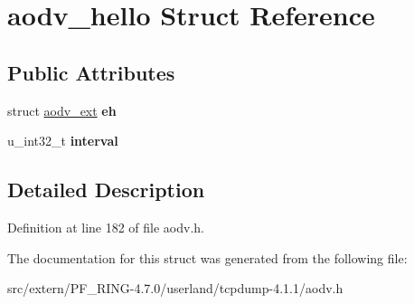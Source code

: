 \hypertarget{structaodv__hello}{
\section{aodv\_\-hello Struct Reference}
\label{structaodv__hello}
}
\subsection*{Public Attributes}
\begin{DoxyCompactItemize}
\item 
\hypertarget{structaodv__hello_a6d78b50a615c376a32d7a0448f4ae771}{
struct \hyperlink{structaodv__ext}{aodv\_\-ext} {\bfseries eh}}
\label{structaodv__hello_a6d78b50a615c376a32d7a0448f4ae771}

\item 
\hypertarget{structaodv__hello_af71ee633f6ef731ca906a4aeaeec6c6c}{
u\_\-int32\_\-t {\bfseries interval}}
\label{structaodv__hello_af71ee633f6ef731ca906a4aeaeec6c6c}

\end{DoxyCompactItemize}


\subsection{Detailed Description}


Definition at line 182 of file aodv.h.



The documentation for this struct was generated from the following file:\begin{DoxyCompactItemize}
\item 
src/extern/PF\_\-RING-\/4.7.0/userland/tcpdump-\/4.1.1/aodv.h\end{DoxyCompactItemize}
